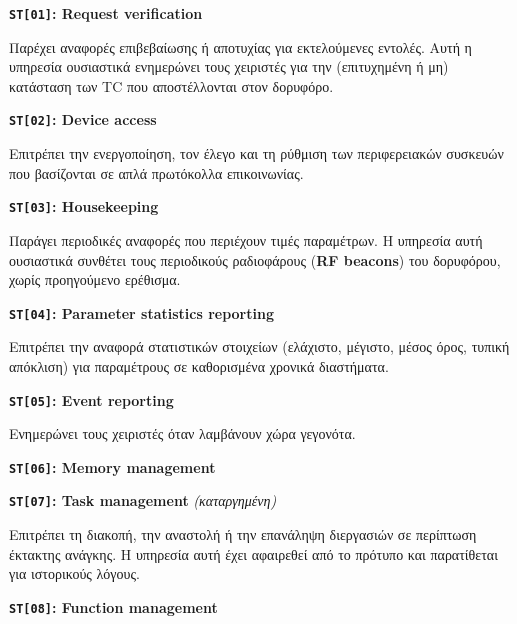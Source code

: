 \documentclass[a4paper,nobib]{tufte-book}
\begin{document}
\begin{compactitem}
	\item \textbf{\texttt{ST[01]}: Request verification}
	
	Παρέχει αναφορές επιβεβαίωσης ή αποτυχίας για εκτελούμενες εντολές. Αυτή η υπηρεσία ουσιαστικά ενημερώνει τους χειριστές για την (επιτυχημένη ή μη) κατάσταση των \ac{TC} που αποστέλλονται στον δορυφόρο.
	
	\item \textbf{\texttt{ST[02]}: Device access}
	
	Επιτρέπει την ενεργοποίηση, τον έλεγο και τη ρύθμιση των περιφερειακών συσκευών που βασίζονται σε απλά πρωτόκολλα επικοινωνίας.
	
	\item \textbf{\texttt{ST[03]}: Housekeeping}
		
		Παράγει περιοδικές αναφορές που περιέχουν τιμές παραμέτρων. Η υπηρεσία αυτή ουσιαστικά συνθέτει τους περιοδικούς ραδιοφάρους (\textbf{\acs{RF} beacons}) του δορυφόρου, χωρίς προηγούμενο ερέθισμα.
		
		\item \textbf{\texttt{ST[04]}: Parameter statistics reporting}
		
		Επιτρέπει την αναφορά στατιστικών στοιχείων (ελάχιστο, μέγιστο, μέσος όρος, τυπική απόκλιση) για παραμέτρους σε καθορισμένα χρονικά διαστήματα.
		
		\item \textbf{\texttt{ST[05]}: Event reporting}
		
		Ενημερώνει τους χειριστές όταν λαμβάνουν χώρα γεγονότα.
		
		\item \textbf{\texttt{ST[06]}: Memory management}
		
		
		\item \textbf{\texttt{ST[07]}: Task management} \emph{(καταργημένη)}
		
		Επιτρέπει τη διακοπή, την αναστολή ή την επανάληψη διεργασιών σε περίπτωση έκτακτης ανάγκης. Η υπηρεσία αυτή έχει αφαιρεθεί από το πρότυπο και παρατίθεται για ιστορικούς λόγους.
		
		\item \textbf{\texttt{ST[08]}: Function management}
		

\end{compactitem}
\end{document}
